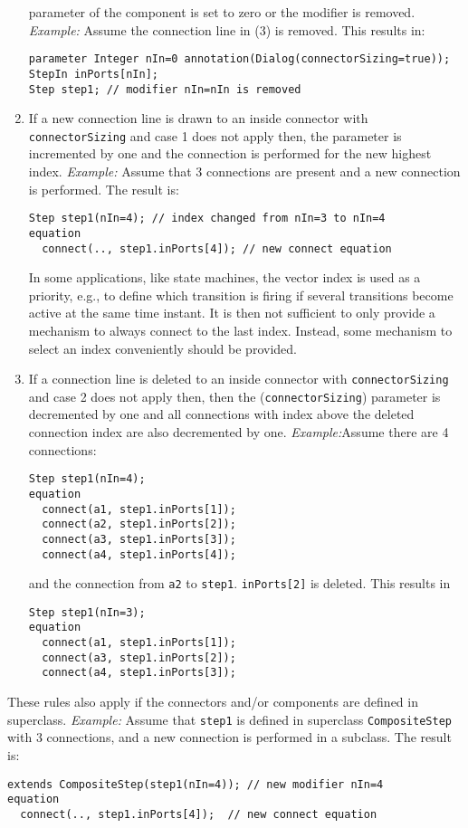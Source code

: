 \begin{nonnormative}
\begin{enumerate}
  parameter of the component is set to zero or the modifier is removed.
  \emph{Example:} Assume the connection line in (3) is removed.
  This results in:
\begin{lstlisting}[language=modelica]
parameter Integer nIn=0 annotation(Dialog(connectorSizing=true));
StepIn inPorts[nIn];
Step step1; // modifier nIn=nIn is removed
\end{lstlisting}
\item
  If a new connection line is drawn to an inside connector with
  \lstinline!connectorSizing! and case 1 does not apply then, the parameter is
  incremented by one and the connection is performed for the new highest
  index. \emph{Example:} Assume that 3 connections are present and a new
  connection is performed. The result is:
\begin{lstlisting}[language=modelica]
  Step step1(nIn=4); // index changed from nIn=3 to nIn=4
equation
  connect(.., step1.inPorts[4]); // new connect equation
\end{lstlisting}
  In some applications, like state machines, the vector index is
  used as a priority, e.g., to define which transition is firing if
  several transitions become active at the same time instant. It is then
  not sufficient to only provide a mechanism to always connect to the
  last index. Instead, some mechanism to select an index conveniently
  should be provided.
\item
  If a connection line is deleted to an inside connector with
  \lstinline!connectorSizing! and case 2 does not apply then, then the
  (\lstinline!connectorSizing!) parameter is decremented by one and all connections
  with index above the deleted connection index are also decremented by
  one. \emph{Example:}Assume there are 4 connections:
\begin{lstlisting}[language=modelica]
  Step step1(nIn=4);
equation
  connect(a1, step1.inPorts[1]);
  connect(a2, step1.inPorts[2]);
  connect(a3, step1.inPorts[3]);
  connect(a4, step1.inPorts[4]);
\end{lstlisting}
  and the connection from \lstinline!a2! to \lstinline!step1!. \lstinline!inPorts[2]! is deleted.
  This results in
\begin{lstlisting}[language=modelica]
  Step step1(nIn=3);
equation
  connect(a1, step1.inPorts[1]);
  connect(a3, step1.inPorts[2]);
  connect(a4, step1.inPorts[3]);
\end{lstlisting}
\end{enumerate}

These rules also apply if the connectors and/or components are
defined in superclass. \emph{Example:} Assume that \lstinline!step1! is defined in
superclass \lstinline!CompositeStep! with 3 connections, and a new connection is
performed in a subclass. The result is:
\begin{lstlisting}[language=modelica]
  extends CompositeStep(step1(nIn=4)); // new modifier nIn=4
equation
  connect(.., step1.inPorts[4]);  // new connect equation
\end{lstlisting}
\end{nonnormative}

